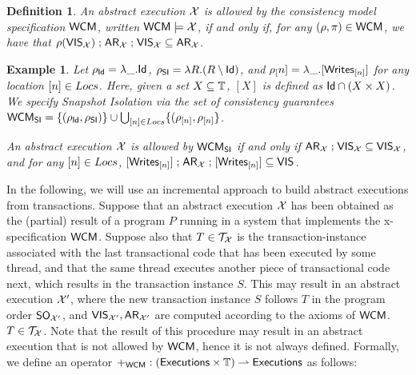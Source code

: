 \documentclass[a4paper,UKenglish]{article}%
\newtheorem{definition}[theorem]{Definition}
\theoremstyle{plain}
\newtheorem{example}[thm]{\sc Example}
\begin{document}
\begin{definition}
An abstract execution $\mathcal{X}$ is allowed by the consistency model specification $\mathsf{WCM}$, 
written $\mathsf{WCM} \models \mathcal{X}$, if and only if, for any $(\rho, \pi) \in \mathsf{WCM}$, we have that $\rho({\mathsf{VIS}}_{\mathcal{X}}) \mathrel{;} {\sf{AR}}_{\mathcal{X}} 
\mathrel{;} {\mathsf{VIS}}_{\mathcal{X}} \subseteq {\sf{AR}}_{\mathcal{X}}$.
\end{definition}

\begin{example}
Let $\rho_{\mathsf{Id}} = \lambda \_. \mathsf{Id}$, $\rho_{\mathsf{SI}} = \lambda R. (R \setminus \mathsf{Id})$, and $\rho_[n] = 
\lambda \_. [{\sf{Writes}}_{[n]}]$ for any location $[n] \in Locs$. Here, given a set $X \subseteq \mathbb{T}$, 
$[X]$ is defined as $\mathsf{Id} \cap (X \times X)$. We specify \emph{Snapshot Isolation} via the set 
of consistency guarantees $\mathsf{WCM}_{\mathsf{SI}} = \{(\rho_{\mathsf{Id}}, \rho_{\mathsf{SI}})\} \cup \bigcup_{[n] \in Locs} \{(\rho_{[n]}, \rho_{[n]}\}$. 

An abstract execution $\mathcal{X}$ is allowed by $\mathsf{WCM}_{\mathsf{SI}}$ if and only if 
${\sf{AR}}_{\mathcal{X}} \mathrel{;} {\mathsf{VIS}}_{\mathcal{X}} \subseteq {\mathsf{VIS}}_{\mathcal{X}}$, 
and for any $[n] \in Locs$, $[{\sf{Writes}}_{[n]}] \mathrel{;} {\sf{AR}}_{\mathcal{X}} \mathrel{;} [{\sf{Writes}}_{[n]}] \subseteq {\mathsf{VIS}}$.
\end{example}

In the following, we will use an incremental approach to build abstract executions from transactions. 
Suppose that an abstract execution $\mathcal{X}$ has been obtained as the (partial) result of a program $P$ running 
in a system that implements the x-specification $\mathsf{WCM}$. 
Suppose also that $T \in \mathcal{T}_{\mathcal{X}}$ is the transaction-instance associated with the last transactional 
code that has been executed by some thread, and that the same thread executes another piece of transactional 
code next, which results in the transaction instance $S$. This may result in an abstract execution $\mathcal{X}'$, 
where the new transaction instance $S$ follows $T$ in the program order ${\sf{SO}}_{\mathcal{X}'}$, and ${\mathsf{VIS}}_{\mathcal{X}'}, 
{\sf{AR}}_{\mathcal{X}'}$ are computed according to the axioms of $\mathsf{WCM}$.
$T \in \mathcal{T}_{\mathcal{X}}$. Note that the result of this procedure may result in an abstract execution that 
is not allowed by $\mathsf{WCM}$, hence it is not always defined.
Formally, we define an operator $+_{\mathsf{WCM}} : ({\mathsf{Executions}} \times \mathbb{T}) \rightharpoonup 
{\mathsf{Executions}}$ as follows:
\end{document}
